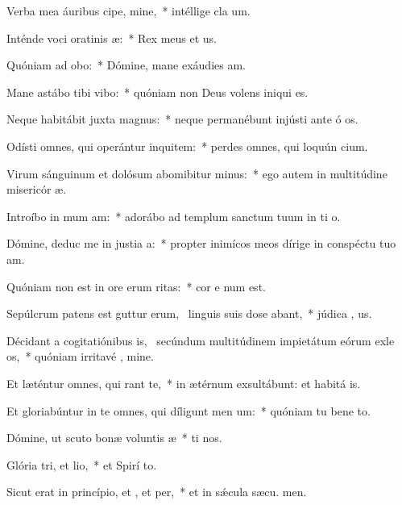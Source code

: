 \item Verba mea áuribus cipe, mine,~* intéllige cla um.
\item Inténde voci oratinis æ:~* Rex meus et  us.
\item Quóniam ad  obo:~* Dómine, mane exáudies  am.
\item Mane astábo tibi  vibo:~* quóniam non Deus volens iniqui  es.
\item Neque habitábit juxta  magnus:~* neque permanébunt injústi ante ó os.
\item Odísti omnes, qui operántur inquitem:~* perdes omnes, qui loquún cium.
\item Virum sánguinum et dolósum abomibitur minus:~* ego autem in multitúdine misericór æ.
\item Introíbo in mum am:~* adorábo ad templum sanctum tuum in ti o.
\item Dómine, deduc me in justia a:~* propter inimícos meos dírige in conspéctu tuo  am.
\item Quóniam non est in ore erum ritas:~* cor e num est.
\item Sepúlcrum patens est guttur erum,~\pscross{} linguis suis dose abant,~* júdica , us.
\item Décidant a cogitatiónibus is,~\pscross{} secúndum multitúdinem impietátum eórum exle os,~* quóniam irritavé , mine.
\item Et læténtur omnes, qui rant  te,~* in ætérnum exsultábunt: et habitá  is.
\item Et gloriabúntur in te omnes, qui díligunt men um:~* quóniam tu bene to.
\item Dómine, ut scuto bonæ voluntis æ~* ti nos.
\item Glória tri, et lio,~* et Spirí to.
\item Sicut erat in princípio, et , et per,~* et in sǽcula sæcu. men.
